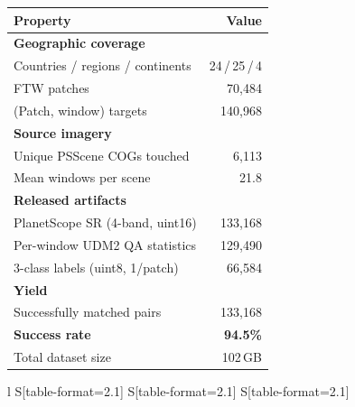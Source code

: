 \documentclass[10pt,twocolumn,letterpaper]{article}
\begin{document}
\begin{table}[h]
\centering
\begin{minipage}[t]{0.54\linewidth}
\centering
{}
\label{tab:scope}
\small
\begin{tabular}{lr}
\toprule
\textbf{Property} & \textbf{Value} \\
\midrule
\multicolumn{2}{l}{\cellcolor{black!7}\textbf{Geographic coverage}}\\
Countries / regions / continents & 24\,/\,25\,/\,4 \\
FTW patches                  & 70{,}484 \\
(Patch, window) targets      & 140{,}968 \\
\midrule
\multicolumn{2}{l}{\cellcolor{black!7}\textbf{Source imagery}}\\
Unique PSScene COGs touched  & 6{,}113 \\
Mean windows per scene       & 21.8 \\
\midrule
\multicolumn{2}{l}{\cellcolor{black!7}\textbf{Released artifacts}}\\
PlanetScope SR (4-band, uint16) & 133{,}168 \\
Per-window UDM2 QA statistics   & 129{,}490 \\
3-class labels (uint8, 1/patch) & 66{,}584 \\
\midrule
\multicolumn{2}{l}{\cellcolor{black!7}\textbf{Yield}}\\
Successfully matched pairs      & 133{,}168 \\
\textbf{Success rate}           & \textbf{94.5\%} \\
Total dataset size              & 102\,GB \\
\bottomrule
\end{tabular}
\end{minipage}\hfill
\begin{minipage}[t]{0.43\linewidth}
\centering
{}
\label{tab:udm2}
\small
\begin{tabular}{l S[table-format=2.1] S[table-format=2.1] S[table-format=2.1]}

\end{tabular}
\end{minipage}
\end{table}
\end{document}
